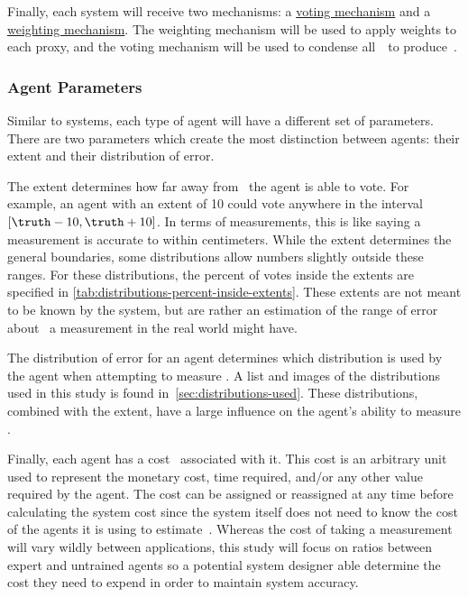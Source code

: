 Finally, each system will receive two mechanisms: a
\hyperref[subsec:voting-mechanisms]{voting mechanism} and a
\hyperref[subsec:weighting-mechanisms]{weighting mechanism}.
The weighting mechanism will be used to apply weights to each proxy, and the
voting mechanism will be used to condense all~\agenttruth\ to produce~\systemtruth.

\subsubsection{Agent Parameters}\label{subsubsec:agent-parameters}
Similar to systems, each type of agent will have a different set of parameters.
There are two parameters which create the most distinction between agents: their
extent and their distribution of error.

The extent determines how far away from \truth\ the agent is able to vote.
For example, an agent with an extent of 10 could vote anywhere in the
interval $[\truth - 10, \truth + 10]$.
In terms of measurements, this is like saying a measurement is accurate to within
 centimeters.
While the extent determines the general boundaries, some distributions allow
numbers slightly outside these ranges.
For these distributions, the percent of votes inside the extents are
specified in \autoref{tab:distributions-percent-inside-extents}.
These extents are not meant to be known by the system, but are rather an
estimation of the range of error about \truth\ a measurement in the real world
might have.

The distribution of error for an agent determines which distribution is used by the
agent when attempting to measure \truth.
A list and images of the distributions used in this study is found
in~\autoref{sec:distributions-used}.
These distributions, combined with the extent, have a large influence on the
agent's ability to measure \truth.

Finally, each agent has a cost \agentcost\ associated with it.
This cost is an arbitrary unit used to represent the monetary cost, time
required, and/or any other value required by the agent.
The cost can be assigned or reassigned at any time before calculating the
system cost since the system itself does not need to know the cost of the
agents it is using to estimate~\truth.
Whereas the cost of taking a measurement will vary wildly between applications, this
study will focus on ratios between expert and untrained agents so a potential system
designer able determine the cost they need to expend in order to maintain system
accuracy.

